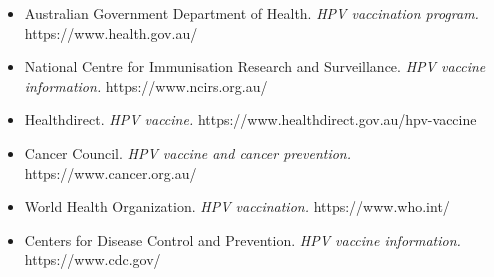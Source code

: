 \begin{itemize}
    \item Australian Government Department of Health. \textit{HPV vaccination program.} https://www.health.gov.au/
    \item National Centre for Immunisation Research and Surveillance. \textit{HPV vaccine information.} https://www.ncirs.org.au/
    \item Healthdirect. \textit{HPV vaccine.} https://www.healthdirect.gov.au/hpv-vaccine
    \item Cancer Council. \textit{HPV vaccine and cancer prevention.} https://www.cancer.org.au/
    \item World Health Organization. \textit{HPV vaccination.} https://www.who.int/
    \item Centers for Disease Control and Prevention. \textit{HPV vaccine information.} https://www.cdc.gov/
\end{itemize}
